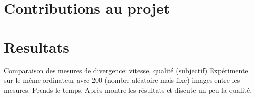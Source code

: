 \documentclass[a4paper]{article}
\begin{document}
\section{Contributions au projet}


\section{Resultats}
Comparaison des mesures de divergence: vitesse, qualit\'e (subjectif)
Exp\'erimente sur le m\^eme ordinateur avec 200 (nombre aléatoire mais fixe) images entre les mesures.
 Prends le temps. Apr\`es montre les r\'esultats et discute un peu la qualit\'e. 

%		
\end{document}
